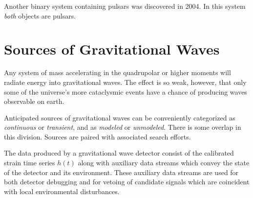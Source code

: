 Another binary system containing pulsars was discovered in 2004.  In
this system \emph{both} objects are
pulsars. \cite{Lyne2004DoublePulsar,Kramer2006Tests}

\section{Sources of Gravitational Waves}
Any system of mass accelerating in the quadrupolar or higher moments
will radiate energy into gravitational waves.  The effect is so weak,
however, that only some of the universe's more cataclysmic events have
a chance of producing waves observable on earth.

Anticipated sources of gravitational waves can be conveniently
categorized as \emph{continuous} or \emph{transient}, and as
\emph{modeled} or \emph{unmodeled}.  There is some overlap in this
division.  Sources are paired with associated search efforts.

The data produced by a gravitational wave detector consist of the
calibrated strain time series $h(t)$ along with auxiliary data streams
which convey the state of the detector and its environment.  These
auxiliary data streams are used for both detector debugging and for
vetoing of candidate signals which are coincident with local
environmental disturbances.


